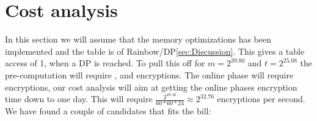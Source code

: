 \section{Cost analysis}
In this section we will assume that the memory optimizations has been implemented and the table is of Rainbow/DP\ref{sec:Discussion}. This gives a table access of 1, when a DP is reached.
To pull this off for $m=2^{39.80}$ and $t=2^{25.08}$ the pre-computation will require , and  encryptions. The online phase will require  encryptions, our cost analysis will aim at getting the online phases encryption time down to one day. This will require $\frac{2^{49.16}}{60*60*24}\approx 2^{32.76}$ encryptions per second. We have found a couple of candidates that fits the bill:


